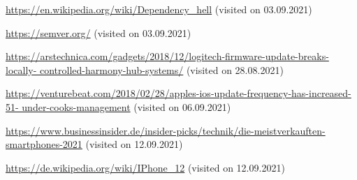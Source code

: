 \begin{thebibliography}{9}
\url{https://en.wikipedia.org/wiki/Dependency_hell} (visited on 03.09.2021)

\url{https://semver.org/} (visited on 03.09.2021)

\url{https://arstechnica.com/gadgets/2018/12/logitech-firmware-update-breaks-locally-
controlled-harmony-hub-systems/} (visited on 28.08.2021)


\url{https://venturebeat.com/2018/02/28/apples-ios-update-frequency-has-increased-51-
under-cooks-management} (visited on 06.09.2021)

\url{https://www.businessinsider.de/insider-picks/technik/die-meistverkauften-smartphones-2021} (visited on 12.09.2021)

\url{https://de.wikipedia.org/wiki/IPhone\_12} (visited on 12.09.2021)



\end{thebibliography}
